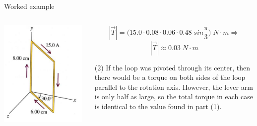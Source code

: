 {\begin{frame}{Worked example}
\begin{columns}[T]
  \begin{column}{0.30\textwidth}
    \begin{center}
      \includegraphics[width=0.98\textwidth]{./images/problems/lect5_rectangular_loop}\\
    \end{center}
  \end{column}
  \begin{column}{0.70\textwidth}
  {\small
         \begin{equation*}
            |\vec{T}| = \Big( 15.0 \cdot 0.08 \cdot 0.06 \cdot 0.48 \; sin \frac{\pi}{3} \Big) \; N \cdot m \Rightarrow
         \end{equation*}
         \begin{equation*}
            |\vec{T}| \approx 0.03 \; N \cdot m
         \end{equation*}
         \vspace{0.3cm}

          (2) If the loop was pivoted through its center, then there would be a torque on
          both sides of the loop parallel to the rotation axis. However, the lever arm
          is only half as large, so the total torque in each case is identical to the value found in part (1).
   }
  \end{column}
\end{columns}


\end{frame}


} %

